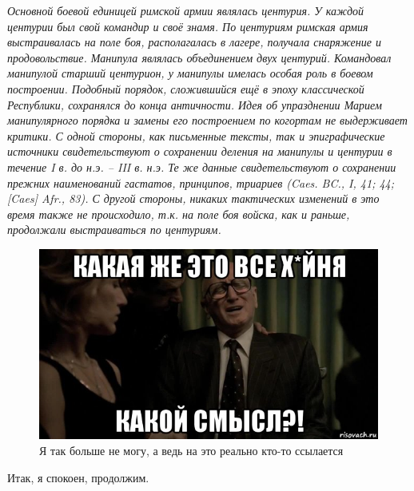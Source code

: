 \textit{Основной боевой единицей римской армии являлась центурия. У каждой центурии был свой командир и своё знамя. По центуриям римская армия выстраивалась на поле боя, располагалась в лагере, получала снаряжение и продовольствие. Манипула являлась объединением двух центурий. Командовал манипулой старший центурион, у манипулы имелась особая роль в боевом построении. Подобный порядок, сложившийся ещё в эпоху классической Республики, сохранялся до конца античности. Идея об упразднении Марием манипулярного порядка и замены его построением по когортам не выдерживает критики. С одной стороны, как письменные тексты, так и эпиграфические источники свидетельствуют о сохранении деления на манипулы и центурии в течение I в. до н.э. – III в. н.э. Те же данные свидетельствуют о сохранении прежних наименований гастатов, принципов, триариев (Caes. BC., I, 41; 44; [Caes] Afr., 83). С другой стороны, никаких тактических изменений в это время также не происходило, т.к. на поле боя войска, как и раньше, продолжали выстраиваться по центуриям.}


\begin{figure}[h!tb]
	\centering\includegraphics[scale=0.6]{Mariy/16016990541294431.png}
	\caption{Я так больше не могу, а ведь на это реально кто-то ссылается}
\end{figure}



Итак, я спокоен, продолжим.


